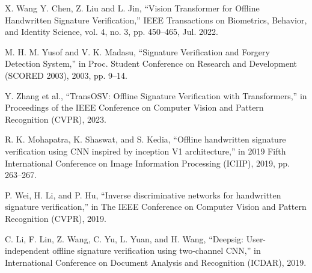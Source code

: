 \begin{thebibliography}{10}
X. Wang Y. Chen, Z. Liu and L. Jin, ``Vision Transformer for Offline Handwritten Signature Verification,'' IEEE Transactions on Biometrics, Behavior, and Identity Science, vol. 4, no. 3, pp. 450--465,
Jul. 2022.

M. H. M. Yusof and V. K. Madasu, ``Signature Verification and Forgery Detection System,'' in Proc. Student Conference on Research and Development (SCORED 2003),
2003, pp. 9--14.

Y. Zhang et al., ``TransOSV: Offline Signature Verification with Transformers,'' in Proceedings of the IEEE Conference on Computer Vision and Pattern Recognition (CVPR),
2023.

R. K. Mohapatra, K. Shaswat, and S. Kedia, ``Offline handwritten signature verification using CNN inspired by inception V1 architecture,'' in 2019 Fifth International Conference on Image Information Processing (ICIIP),
2019, pp. 263--267.

P. Wei, H. Li, and P. Hu, ``Inverse discriminative networks for handwritten signature verification,'' in The IEEE Conference on Computer Vision and Pattern Recognition (CVPR),
2019.

C. Li, F. Lin, Z. Wang, C. Yu, L. Yuan, and H. Wang, ``Deepsig: User-independent offline signature verification using two-channel CNN,'' in International Conference on Document Analysis and Recognition (ICDAR),
2019.








\end{thebibliography}



























